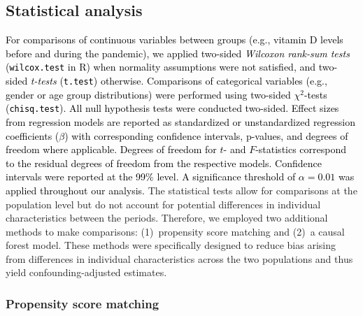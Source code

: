 \documentclass[12pt]{article}
\newcommand{\REV}[1]{\textcolor{black}{#1}}
\begin{document}
\subsection*{Statistical analysis}

\REV{For comparisons of continuous variables between groups (e.g., vitamin D levels before and during the pandemic), we applied two-sided \textit{Wilcoxon rank-sum tests} (\texttt{wilcox.test} in R) when normality assumptions were not satisfied, and two-sided \textit{t-tests} (\texttt{t.test}) otherwise. Comparisons of categorical variables (e.g., gender or age group distributions) were performed using two-sided $\chi^2$-tests (\texttt{chisq.test}). All null hypothesis tests were conducted two-sided. Effect sizes from regression models are reported as standardized or unstandardized regression coefficients ($\beta$) with corresponding confidence intervals, p-values, and degrees of freedom where applicable. Degrees of freedom for $t$- and $F$-statistics correspond to the residual degrees of freedom from the respective models. Confidence intervals were reported at the 99\% level. A significance threshold of $\alpha = 0.01$ was applied throughout our analysis.}  
The statistical tests allow for comparisons at the population level but do not account for potential differences in individual characteristics between the periods. Therefore, we employed two additional methods to make comparisons: (1)~propensity score matching and (2)~a causal forest model. These methods were specifically designed to reduce bias arising from differences in individual characteristics across the two populations and thus yield confounding-adjusted estimates.

\subsubsection*{Propensity score matching}
\end{document}
